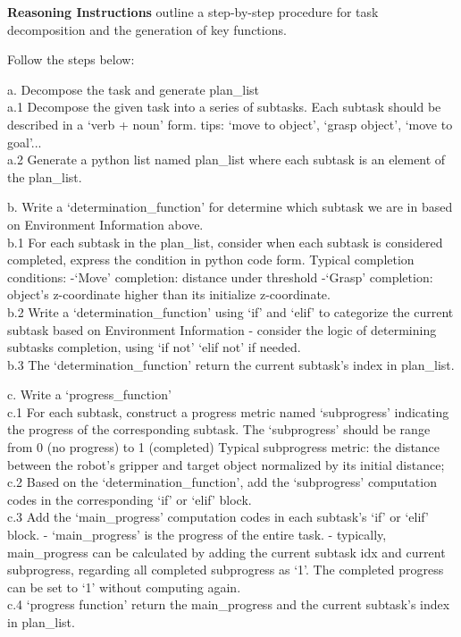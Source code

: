 \textbf{Reasoning Instructions}
outline a step-by-step procedure for task decomposition and the generation of key functions.
\begin{tcolorbox}[colframe=kuangyellow, colback=backgroundyellow, coltitle=black, title={Reasoning Instructions}, breakable]
Follow the steps below:

\vspace{2pt}

a. Decompose the task and generate plan\_list\\
a.1 Decompose the given task into a series of subtasks. Each subtask should be described in a `verb + noun' form.
tips: `move to object', `grasp object', `move to goal'...\\
a.2 Generate a python list named plan\_list where each subtask is an element of the plan\_list.

\vspace{5pt}

b. Write a `determination\_function' for determine which subtask we are in based on Environment Information above.\\
b.1 For each subtask in the plan\_list, consider when each subtask is considered completed, express the condition in python code form.
Typical completion conditions:
 -`Move' completion: distance under threshold
 -`Grasp' completion: object's z-coordinate higher than its initialize z-coordinate.\\
b.2 Write a `determination\_function' using `if' and `elif' to categorize the current subtask based on Environment Information
 - consider the logic of determining subtasks completion, using `if not' `elif not' if needed.\\
b.3 The `determination\_function' return the current subtask's index in plan\_list.

\vspace{5pt}

c. Write a `progress\_function'\\
c.1 For each subtask, construct a progress metric named `subprogress' indicating the progress of the corresponding subtask. The `subprogress' should be range from 0 (no progress) to 1 (completed)
Typical subprogress metric: the distance between the robot's gripper and target object normalized by its initial distance; \\
c.2 Based on the `determination\_function', add the `subprogress' computation codes in the corresponding `if' or `elif' block.\\
c.3 Add the `main\_progress' computation codes in each subtask's `if' or `elif' block.
- `main\_progress' is the progress of the entire task.
- typically, main\_progress can be calculated by adding the current subtask idx and current subprogress, regarding all completed subprogress as `1'.
The completed progress can be set to `1' without computing again.\\
c.4 `progress function' return the main\_progress and the current subtask's index in plan\_list.

\end{tcolorbox}

